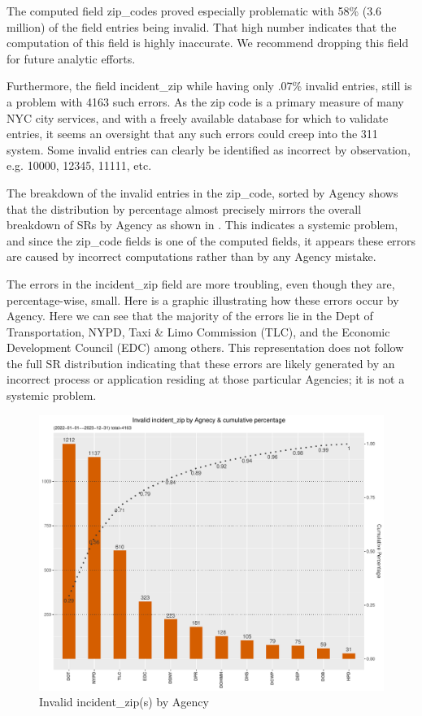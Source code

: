 \documentclass[12pt, titlepage]{article}
\begin{document}
	The computed field zip\_codes proved especially problematic with 
	58\% (3.6 million) of the field entries being invalid. That high number 
	indicates that the computation of this field is highly inaccurate. We 
	recommend dropping this field for future analytic efforts.
	
	Furthermore, the field incident\_zip while having only .07\% invalid entries, 
	still is a problem with 4163 such errors. As the zip code is a primary 
	measure of many NYC city services, and with a freely available 
	database for which to validate entries, it seems an oversight 
	that any such errors could creep into the 311 system. 
	Some invalid entries can clearly be identified as incorrect by 
	observation, e.g. 10000, 12345, 11111, etc. 
	
	The breakdown of the invalid entries in the zip\_code, sorted by 
	Agency shows that the distribution by percentage almost precisely 
	mirrors the overall breakdown of SRs by Agency as shown in . 
	This indicates a systemic problem, and since the zip\_code fields is 
	one of the computed fields, it appears these errors are caused by 
	incorrect computations rather than by any Agency mistake.
	
	The  errors in the incident\_zip field are more troubling, even though 
	they are, percentage-wise, small. Here is a graphic illustrating how 
	these errors occur by Agency. Here we can see that the majority of 
	the errors lie in the Dept of Transportation, NYPD, Taxi \& Limo 
	Commission (TLC), and the Economic Development Council (EDC) 
	among others. This representation does not follow the full SR 
	distribution indicating that these errors are likely generated by 
	an incorrect process or application residing at those particular 
	Agencies; it is not a systemic problem.

	\begin{figure}[tbp]
		\centering
		\includegraphics[width=\textwidth]{invalid_incident_zip.pdf}
		\caption{Invalid incident\_zip(s) by Agency} 
		\label{fig:invalid_incident_zip}
	\end{figure}
	
\end{document}
